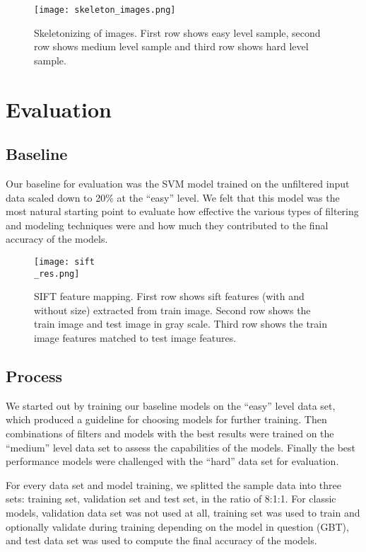 \documentclass[
	a4paper, %
	10pt, %
	unnumberedsections, %
	twoside, %
]{t0004}
\begin{document}
\begin{figure}
	\texttt{[image: skeleton\_images.png]}
	\caption{Skeletonizing of images. First row shows easy level sample, second row shows medium level sample and third row shows hard level sample.}
	\label{fig:sklimages}
\end{figure}

\section{Evaluation}

\subsection{Baseline}

Our baseline for evaluation was the SVM model trained on the unfiltered input data scaled down to 20\% at the ``easy'' level. We felt that this model was the most natural starting point to evaluate how effective the various types of filtering and modeling techniques were and how much they contributed to the final accuracy of the models.

\begin{figure}
	\texttt{[image: sift\\\_res.png]}
	\caption{SIFT feature mapping. First row shows sift features (with and without size) extracted from train image. Second row shows the train image and test image in gray scale. Third row shows the train image features matched to test image features.}
	\label{fig:siftres}
\end{figure}

\subsection{Process}

We started out by training our baseline models on the ``easy'' level data set, which produced a guideline for choosing models for further training. Then combinations of filters and models with the best results were trained on the ``medium'' level data set to assess the capabilities of the models. Finally the best performance models were challenged with the ``hard'' data set for evaluation.

For every data set and model training, we splitted the sample data into three sets: training set, validation set and test set, in the ratio of 8:1:1. For classic models, validation data set was not used at all, training set was used to train and optionally validate during training depending on the model in question (GBT), and test data set was used to compute the final accuracy of the models.
\end{document}
